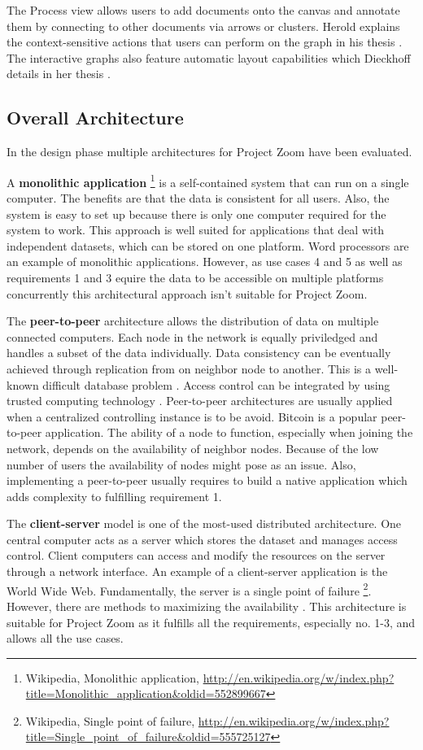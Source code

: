 The Process view allows users to add documents onto the canvas and annotate them by connecting to other documents via arrows or clusters. Herold explains the context-sensitive actions that users can perform on the graph in his thesis \cite{Herold_2013}. The interactive graphs also feature automatic layout capabilities which Dieckhoff details in her thesis \cite{Dieckhoff_2013}.


\subsection{Overall Architecture}
In the design phase multiple architectures for Project Zoom have been evaluated. 

A \textbf{monolithic application} \footnote{Wikipedia, Monolithic application, \url{http://en.wikipedia.org/w/index.php?title=Monolithic_application&oldid=552899667}} is a self-contained system that can run on a single computer. The benefits are that the data is consistent for all users.  Also, the system is easy to set up because there is only one computer required for the system to work. This approach is well suited for applications that deal with independent datasets, which can be stored on one platform. Word processors are an example of monolithic applications. However, as use cases 4 and 5 as well as requirements 1 and 3 equire the data to be accessible on multiple platforms concurrently this architectural approach isn't suitable for Project Zoom.

The \textbf{peer-to-peer} \cite{Schollmeier_2001} architecture allows the distribution of data on multiple connected computers. Each node in the network is equally priviledged and handles a subset of the data individually. Data consistency can be eventually achieved through replication from on neighbor node to another. This is a well-known difficult database problem \cite{Gray_1996}. Access control can be integrated by using trusted computing technology \cite{Sandhu_2005}. Peer-to-peer architectures are usually applied when a centralized controlling instance is to be avoid. Bitcoin is a popular peer-to-peer application. The ability of a node to function, especially when joining the network, depends on the availability of neighbor nodes. Because of the low number of users the availability of nodes might pose as an issue. Also, implementing a peer-to-peer usually requires to build a native application which adds complexity to fulfilling requirement 1.

The \textbf{client-server} \cite{Berson_1996} model is one of the most-used distributed architecture. One central computer acts as a server which stores the dataset and manages access control. Client computers can access and modify the resources on the server through a network interface. An example of a client-server application is the World Wide Web. Fundamentally, the server is a single point of failure \footnote{Wikipedia, Single point of failure, \url{http://en.wikipedia.org/w/index.php?title=Single_point_of_failure&oldid=555725127}}. However, there are methods to maximizing the availability \cite{Gray_1991} \cite{Colyer_2000}. This architecture is suitable for Project Zoom as it fulfills all the requirements, especially no. 1-3, and allows all the use cases.

